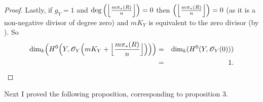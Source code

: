 \documentclass[11pt]{article} %
\begin{document}
\begin{proof}
	Lastly, if $g_Y=1$ and $\deg\Big(\Big{\lfloor}\frac{m\pi_*(R)}{n}\Big{\rfloor}\Big)=0$ then $\Big(\Big{\lfloor}\frac{m\pi_*(R)}{n}\Big{\rfloor}\Big)=0$ (as it is a non-negative divisor of degree 		zero) and $mK_Y$ is equivalent to the zero divisor (by \citep[Chap. IV,\ Example 1.3.6]{hart}). 		So
		\begin{eqnarray*}
			\mbox{dim}_k\Big(H^0\Big(Y,\mathscr{O}_Y\Big(mK_Y+\Big{\lfloor}{\frac{m\pi_*(R)}{n}}\Big{\rfloor} \Big)\Big)\Big) &= & \mbox{dim}_k(H^0(Y,\mathscr{O}_Y(0))) \\ 
			& = & 1.
		\end{eqnarray*}
\end{proof}

Next I proved the following proposition, corresponding to proposition 3.\\
\end{document}
